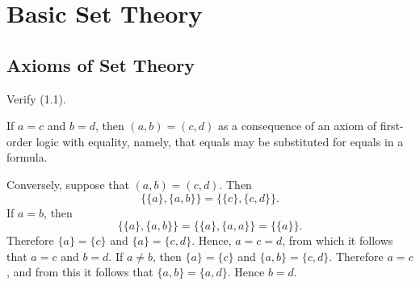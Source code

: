 \part{Basic Set Theory}

\chapter{Axioms of Set Theory}

 Verify (1.1).
\begin{solution}
  If $a = c$ and $b = d$, then $(a, b) = (c, d)$ as a consequence of an axiom of 
  first-order logic with equality, namely, that equals may be substituted for
  equals in a formula.

  Conversely, suppose that $(a, b) = (c, d)$. Then
  \[
    \{ \{ a \}, \{ a, b \} \}  = \{ \{ c \}, \{ c, d \} \}.
  \]
  If $a = b$, then
  \[
    \{ \{ a \}, \{ a, b \} \} = \{ \{ a \}, \{ a, a \} \} = \{ \{ a \} \}.
  \]
Therefore $\{ a \} = \{ c \}$ and  $\{ a \} = \{ c, d \}$. Hence, $a = c = d$,
from which it follows that $a = c$ and $b = d$. If $a \neq b$, then
$\{ a \} = \{ c \}$ and $\{ a, b \} = \{ c, d \}$. Therefore $a = c$, and from
this it follows that $\{ a, b \} = \{ a, d \}$. Hence $b = d$.
\end{solution}